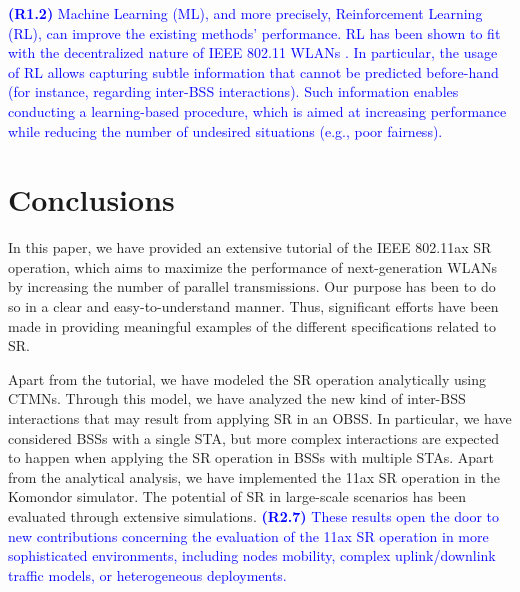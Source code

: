 \documentclass{ieeeaccess}
\begin{document}
\textcolor{blue}{\textbf{(R1.2)} Machine Learning (ML), and more precisely, Reinforcement Learning (RL), can improve the existing methods' performance. RL has been shown to fit with the decentralized nature of IEEE 802.11 WLANs \cite{long2007non, naddafzadeh2010distributed, zhou2011reinforcement, ghadimi2017reinforcement, wilhelmi2019collaborative, wilhelmi2019potential}. In particular, the usage of RL allows capturing subtle information that cannot be predicted before-hand (for instance, regarding inter-BSS interactions). Such information enables conducting a learning-based procedure, which is aimed at increasing performance while reducing the number of undesired situations (e.g., poor fairness).}

\section{Conclusions}
\label{section:conclusions}
In this paper, we have provided an extensive tutorial of the IEEE 802.11ax SR operation, which aims to maximize the performance of next-generation WLANs by increasing the number of parallel transmissions. Our purpose has been to do so in a clear and easy-to-understand manner. Thus, significant efforts have been made in providing meaningful examples of the different specifications related to SR. %

Apart from the tutorial, we have modeled the SR operation analytically using CTMNs. Through this model, we have analyzed the new kind of inter-BSS interactions that may result from applying SR in an OBSS. In particular, we have considered BSSs with a single STA, but more complex interactions are expected to happen when applying the SR operation in BSSs with multiple STAs. Apart from the analytical analysis, we have implemented the 11ax SR operation in the Komondor simulator. The potential of SR in large-scale scenarios has been evaluated through extensive simulations. \textcolor{blue}{\textbf{(R2.7)} These results open the door to new contributions concerning the evaluation of the 11ax SR operation in more sophisticated environments, including nodes mobility, complex uplink/downlink traffic models, or heterogeneous deployments.}	
\end{document}
